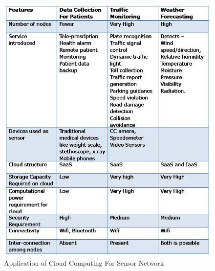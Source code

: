 \documentclass {report}
\begin{document}
\begin{figure}
\begin{center}
\includegraphics [scale=0.48]{table3}
\caption{Application of Cloud Computing For Sensor Network}
\end{center}
\end{figure}
\end{document}
